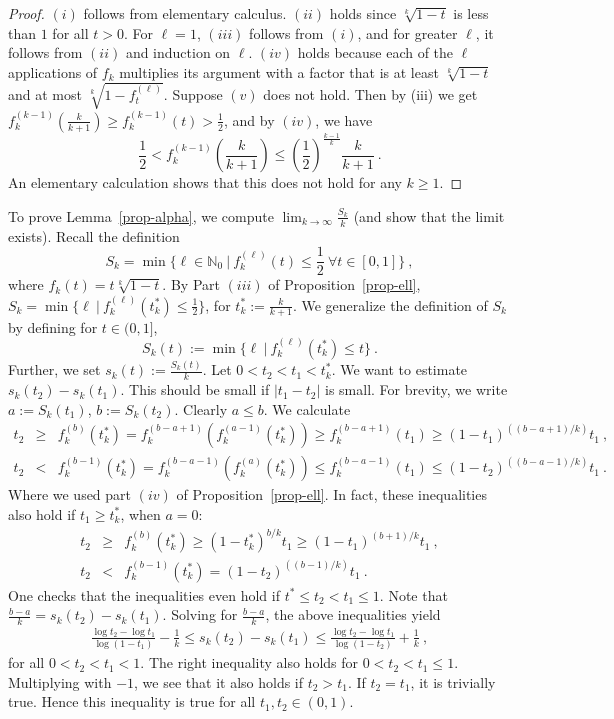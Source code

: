 \documentclass[a4paper, 11pt]{article}
\begin{document}
\begin{proof}
  $(i)$ follows from elementary calculus. $(ii)$ holds since
  $\sqrt[k]{1-t}$ is less than $1$ for all $t > 0$. For $\ell=1$,
  $(iii)$ follows from $(i)$, and for greater $\ell$, it follows from
  $(ii)$ and induction on $\ell$. $(iv)$ holds because each of the
  $\ell$ applications of $f_k$ multiplies its argument with a factor
  that is at least $\sqrt[k]{1-t}$ and at most $\sqrt[k]{1 -
    f^{(\ell)}_t}$.  Suppose $(v)$ does not hold. Then by (iii) we get
  $f^{(k-1)}_k\left(\frac{k}{k+1}\right)\geq f_k^{(k-1)}(t) >
  \frac{1}{2}$, and by $(iv)$, we have
  $$
  \frac{1}{2} < f_k^{(k-1)}\left(\frac{k}{k+1}\right)
  \leq \left(\frac{1}{2}\right)^{\frac{k-1}{k}} \frac{k}{k+1} \ .
  $$
  An elementary calculation shows that this does not hold for any 
  $k \geq 1$.
\end{proof}


To prove Lemma~\ref{prop-alpha}, we compute $\lim_{k \rightarrow
  \infty} \frac{S_k}{k}$ (and show that the limit exists). Recall
the definition
$$
S_k = \min\{\ell \in \mathbb{N}_0 \ | \ f_k^{(\ell)}(t) \leq
\frac{1}{2} \ \forall t \in [0,1] \} \ ,
$$
where $f_k(t)=t\sqrt[k]{1-t}$.  By Part $(iii)$ of
Proposition~\ref{prop-ell}, $S_k =\min\{\ell \ | \
f_k^{(\ell)}(t^*_k) \leq \frac{1}{2}\}$, for $t^*_k := \frac{k}{k+1}$. We
generalize the definition of $S_k$ by defining for $t \in (0,1]$,
$$
S_k(t) := \min \{\ell \ | \ f_k^{(\ell)} (t^*_k) \leq t\} \ .
$$
Further, we set $s_k(t) := \frac{S_k(t)}{k}$.
 Let $0 < t_2 < t_1 < t^*_k$. We want to estimate
$s_k(t_2) - s_k(t_1)$. This should be small if $|t_1-t_2|$ is small.
For brevity, we write $a := S_k(t_1)$, $b := S_k(t_2)$. Clearly $a
\leq b$. We calculate
\begin{eqnarray*}
  t_2 & \geq & f_k^{(b)}(t^*_k) = f_k^{(b-a+1)} (f_k^{(a-1)}(t^*_k))
  \geq f_k^{(b-a+1)}(t_1) \geq (1-t_1)^{((b-a+1)/k)} t_1 \ ,\\
  t_2 &  <& f_k^{(b-1)}(t^*_k) = f_k^{(b-a-1)}(f_k^{(a)}(t^*_k))
  \leq f_k^{(b-a-1)}(t_1) \leq (1-t_2)^{((b-a-1)/k)} t_1 \ .
\end{eqnarray*}
Where we used part $(iv)$ of Proposition~\ref{prop-ell}.  In fact, these
inequalities also hold if $t_1 \geq t^*_k$, when $a=0$:
\begin{eqnarray*}
  t_2 & \geq & f_k^{(b)}(t^*_k) \geq (1-t^*_k)^{b/k}t_1 
  \geq (1-t_1)^{(b+1)/k}t_1\ , \\
  t_2 & < & f_k^{(b-1)}(t^*_k) = (1-t_2)^{((b-1)/k)} t_1 \ .
\end{eqnarray*}
One checks that the inequalities even hold if $t^* \leq t_2 < t_1 \leq
1$. Note that $\frac{b-a}{k}=s_k(t_2)-s_k(t_1)$.  Solving for
$\frac{b-a}{k}$, the above inequalities yield
\begin{eqnarray}
\frac{\log t_2 - \log t_1}{\log (1-t_1)} - \frac{1}{k} \leq s_k(t_2) -
s_k(t_1) \leq \frac{\log t_2 - \log t_1}{\log (1-t_2)}+ \frac{1}{k} \ ,
\label{ineq-sk}
\end{eqnarray}
for all $0 < t_2 < t_1 < 1$. The right inequality also holds for $0 <
t_2 < t_1 \leq 1$. Multiplying with $-1$, we see that it also holds if
$t_2 > t_1$. If $t_2 = t_1$, it is trivially true.
Hence this inequality is true for all $t_1,t_2 \in (0,1)$.\\
\end{document}
